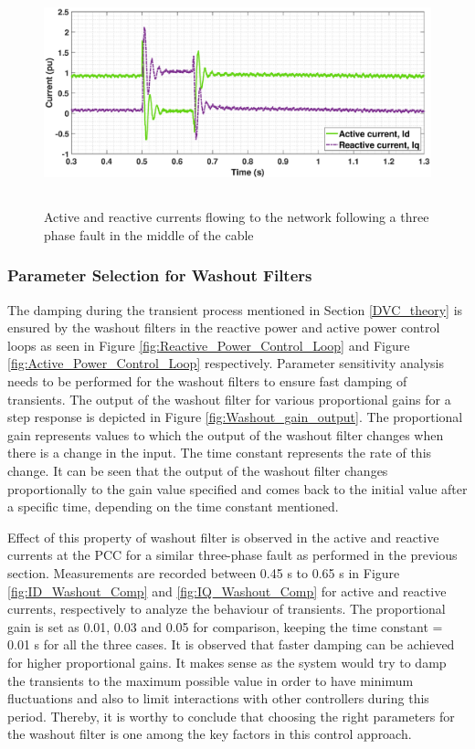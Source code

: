 \begin{figure}[H]
    \includegraphics[height = 6.5cm,width = \textwidth]{Diagrams/Chapter_3/ID_IQ_Final.eps}
    \caption{Active and reactive currents flowing to the network following a three phase fault in the middle of the cable}
    \label{fig:ID_IQ_Final_3}
\end{figure}


\subsubsection{Parameter Selection for Washout Filters}\label{para_selection_washout}
The damping during the transient process mentioned in Section \ref{DVC_theory} is ensured by the washout filters in the reactive power and active power control loops as seen in Figure \ref{fig:Reactive_Power_Control_Loop} and Figure \ref{fig:Active_Power_Control_Loop} respectively. Parameter sensitivity analysis needs to be performed for the washout filters to ensure fast damping of transients. The output of the washout filter for various proportional gains for a step response is depicted in Figure \ref{fig:Washout_gain_output}. The proportional gain represents values to which the output of the washout filter changes when there is a change in the input. The time constant represents the rate of this change. It can be seen that the output of the washout filter changes proportionally to the gain value specified and comes back to the initial value after a specific time, depending on the time constant mentioned.


Effect of this property of washout filter is observed in the active and reactive currents at the \gls{PCC} for a similar three-phase fault as performed in the previous section. Measurements are recorded between 0.45 s to 0.65 s in Figure \ref{fig:ID_Washout_Comp} and \ref{fig:IQ_Washout_Comp} for active and reactive currents, respectively to analyze the behaviour of transients. The proportional gain is set as 0.01, 0.03 and 0.05 for comparison, keeping the time constant = 0.01 s for all the three cases. It is observed that faster damping can be achieved for higher proportional gains. It makes sense as the system would try to damp the transients to the maximum possible value in order to have minimum fluctuations and also to limit interactions with other controllers during this period. Thereby, it is worthy to conclude that choosing the right parameters for the washout filter is one among the key factors in this control approach.

